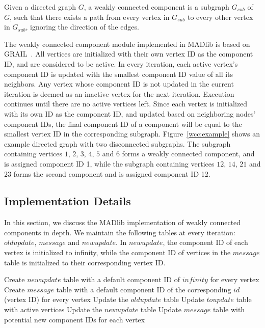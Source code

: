 Given a directed graph $G$, a weakly connected component is a subgraph
$G_{sub}$ of $G$, such that there exists a path from every vertex in $G_{sub}$
to every other vertex in $G_{sub}$, ignoring the direction of the edges.

The weakly connected component module implemented in MADlib is based on
GRAIL~\cite{grail}. All vertices are initialized with their own vertex
ID as the component ID, and are considered to be active. In every iteration,
each active vertex's component ID is updated with the smallest component ID
value of all its neighbors. Any vertex whose component ID is not updated in
the current iteration is deemed as an inactive vertex for the next iteration.
Execution continues until there are no active vertices left. Since each vertex
is initialized with its own ID as the component ID, and updated based on
neighboring nodes' component IDs, the final component ID of a component will
be equal to the smallest vertex ID in the corresponding subgraph.
Figure~\ref{wcc:example} shows an example directed graph with two disconnected
subgraphs. The subgraph containing vertices $1$, $2$, $3$, $4$, $5$ and $6$
forms a weakly connected component, and is assigned component ID 1, while the
subgraph containing vertices $12$, $14$, $21$ and $23$ forms the second component
and is assigned component ID 12.

\subsection{Implementation Details} \label{sec:wcc:implementation}

In this section, we discuss the MADlib implementation of weakly connected
components in depth. We maintain the following tables at every iteration:
$oldupdate$, $message$ and $newupdate$. In $newupdate$, the component ID
of each vertex is initialized to infinity, while the component ID of vertices
in the $message$ table is initialized to their corresponding vertex ID.

\begin{algorithm} \label{alg:wcc:high}
\begin{algorithmic}[1]
    \State Create $newupdate$ table with a default component ID of
            $infinity$ for every vertex
    \State Create $message$ table with a default component ID of the
            corresponding $id$ (vertex ID) for every vertex
    \Repeat
        \State Update the $oldupdate$ table
        \State Update $toupdate$ table with active vertices
        \State Update the $newupdate$ table
        \State Update $message$ table with potential new component IDs for each vertex
\end{algorithmic}
\end{algorithm}

